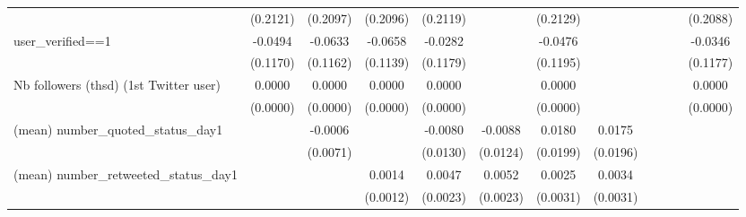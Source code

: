 {\begin{tabular}{l*{11}{c}}
                    &    (0.2121)         &    (0.2097)         &    (0.2096)         &    (0.2119)         &                     &    (0.2129)         &                     &                     &                     &                     &    (0.2088)         \\
user\_verified==1    &     -0.0494         &     -0.0633         &     -0.0658         &     -0.0282         &                     &     -0.0476         &                     &                     &                     &                     &     -0.0346         \\
                    &    (0.1170)         &    (0.1162)         &    (0.1139)         &    (0.1179)         &                     &    (0.1195)         &                     &                     &                     &                     &    (0.1177)         \\
Nb followers (thsd) (1st Twitter user)&      0.0000\sym{*}  &      0.0000         &      0.0000         &      0.0000\sym{*}  &                     &      0.0000         &                     &                     &                     &                     &      0.0000         \\
                    &    (0.0000)         &    (0.0000)         &    (0.0000)         &    (0.0000)         &                     &    (0.0000)         &                     &                     &                     &                     &    (0.0000)         \\
(mean) number\_quoted\_status\_day1&                     &     -0.0006         &                     &     -0.0080         &     -0.0088         &      0.0180         &      0.0175         &                     &                     &                     &                     \\
                    &                     &    (0.0071)         &                     &    (0.0130)         &    (0.0124)         &    (0.0199)         &    (0.0196)         &                     &                     &                     &                     \\
(mean) number\_retweeted\_status\_day1&                     &                     &      0.0014         &      0.0047\sym{**} &      0.0052\sym{**} &      0.0025         &      0.0034         &                     &                     &                     &                     \\
                    &                     &                     &    (0.0012)         &    (0.0023)         &    (0.0023)         &    (0.0031)         &    (0.0031)         &                     &                     &                     &                     \\

\end{tabular}}
